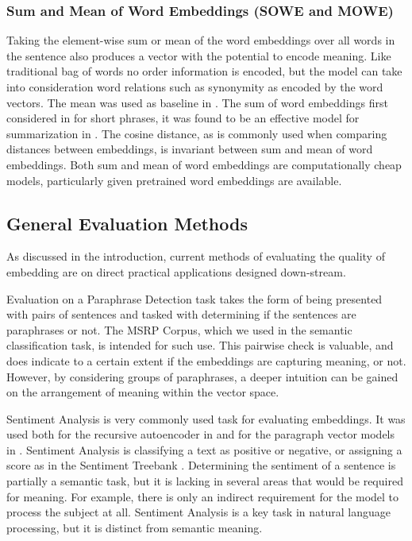 \documentclass[]{book}
\begin{document}
\subsubsection{Sum and Mean of Word Embeddings (SOWE and MOWE)}

Taking the element-wise sum or mean of the word embeddings over all
words in the sentence also produces a vector with the potential to
encode meaning. Like traditional bag of words no order information
is encoded, but the model can take into consideration word relations
such as synonymity as encoded by the word vectors. The mean was used
as baseline in \cite{le2014distributed}. The sum of word embeddings
first considered in \cite{mikolovSkip} for short phrases, it was
found to be an effective model for summarization in \cite{KaagebExtractiveSummaristation}.
The cosine distance, as is commonly used when comparing distances
between embeddings, is invariant between sum and mean of word embeddings.
Both sum and mean of word embeddings are computationally cheap models,
particularly given pretrained word embeddings are available.


\subsection{General Evaluation Methods}

As discussed in the introduction, current methods of evaluating the
quality of embedding are on direct practical applications designed
down-stream.

Evaluation on a Paraphrase Detection task takes the form of being
presented with pairs of sentences and tasked with determining if the
sentences are paraphrases or not. The MSRP Corpus, \cite{msrParapharaCorpus}
which we used in the semantic classification task, is intended for
such use. This pairwise check is valuable, and does indicate to a
certain extent if the embeddings are capturing meaning, or not. However,
by considering groups of paraphrases, a deeper intuition can be gained
on the arrangement of meaning within the vector space.

Sentiment Analysis is very commonly used task for evaluating embeddings.
It was used both for the recursive autoencoder in \cite{SocherEtAl2011:RAE}
and for the paragraph vector models in \cite{le2014distributed}.
Sentiment Analysis is classifying a text as positive or negative,
or assigning a score as in the Sentiment Treebank \cite{RvNTN}. Determining
the sentiment of a sentence is partially a semantic task, but it is
lacking in several areas that would be required for meaning. For example,
there is only an indirect requirement for the model to process the
subject at all. Sentiment Analysis is a key task in natural language
processing, but it is distinct from semantic meaning.
\end{document}
